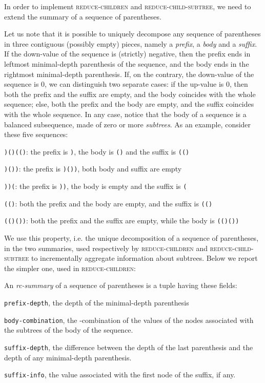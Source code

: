 \documentclass[a4paper,USenglish]{lipics}
\newcommand{\var}[1]{\textrm{\texttt{#1}}}
\begin{document}
In order to implement \textsc{reduce-children} and \textsc{reduce-child-subtree}, we need to extend the summary of a sequence of parentheses. 

Let us note that it is possible to uniquely decompose any sequence of parentheses in three contiguous (possibly empty) pieces, namely a \emph{prefix}, a \emph{body} and a \emph{suffix}. If the down-value of the sequence is (strictly) negative, then the prefix ends in leftmost minimal-depth parenthesis of the sequence, and the body ends in the rightmost minimal-depth parenthesis. If, on the contrary, the down-value of the sequence is 0, we can distinguish two separate cases: if the up-value is 0, then both the prefix and the suffix are empty, and the body coincides with the whole sequence; else, both the prefix and the body are empty, and the suffix coincides with the whole sequence.
In any case, notice that the body of a sequence is a balanced subsequence, made of zero or more \emph{subtrees}. As an example, consider these five sequences:
\begin{compactitem}
\item \texttt{)()(()}: the prefix is \texttt{)}, the body is \texttt{()} and the suffix is \texttt{(()}
\item \texttt{)())}: the prefix is \texttt{)())}, both body and suffix are empty
\item \texttt{))(}: the prefix is \texttt{))}, the body is empty and the suffix is \texttt{(}
\item \texttt{(()}: both the prefix and the body are empty, and the suffix is \texttt{(()}
\item \texttt{(()())}: both the prefix and the suffix are empty, while the body is \texttt{(()())}
\end{compactitem}
 We use this property, i.e. the unique decomposition of a sequence of parentheses, in the two summaries, used respectively by \textsc{reduce-children} and \textsc{reduce-child-subtree} to incrementally aggregate information about subtrees. Below we report the simpler one, used in \textsc{reduce-children}:
			\begin{definition}[rc-summary]
				An \emph{rc-summary} of a sequence of parentheses is a tuple having these fields:
				\begin{compactitem}
					\item {\var{prefix-depth}}, the depth of the minimal-depth parenthesis
					\item {\var{body-combination}}, the -combination of the values of the nodes associated with the subtrees of the body of the sequence.
					\item {\var{suffix-depth}}, the difference between the depth of the last parenthesis and the depth of any minimal-depth parenthesis.
					\item {\var{suffix-info}}, the value associated with the first node of the suffix, if any.
				\end{compactitem}
			\end{definition}
\end{document}
